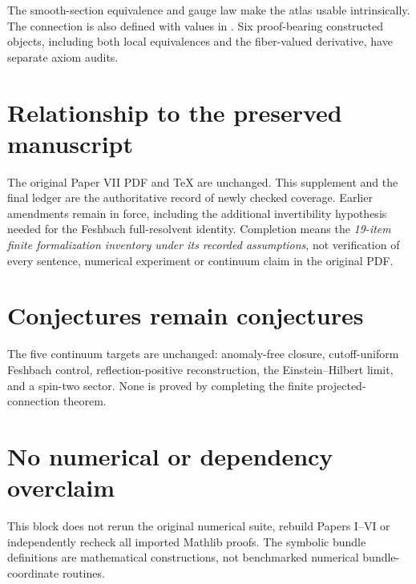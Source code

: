\documentclass[10pt,letterpaper]{article}
\begin{document}
The smooth-section equivalence and gauge law make the atlas usable intrinsically. The connection is also defined with values in . Six proof-bearing constructed objects, including both local equivalences and the fiber-valued derivative, have separate axiom audits.

\section*{Relationship to the preserved manuscript}
The original Paper VII PDF and TeX are unchanged. This supplement and the final ledger are the authoritative record of newly checked coverage. Earlier amendments remain in force, including the additional invertibility hypothesis needed for the Feshbach full-resolvent identity. Completion means the \emph{19-item finite formalization inventory under its recorded assumptions}, not verification of every sentence, numerical experiment or continuum claim in the original PDF.

\section*{Conjectures remain conjectures}
The five continuum targets are unchanged: anomaly-free closure, cutoff-uniform Feshbach control, reflection-positive reconstruction, the Einstein--Hilbert limit, and a spin-two sector. None is proved by completing the finite projected-connection theorem.

\section*{No numerical or dependency overclaim}
This block does not rerun the original numerical suite, rebuild Papers I--VI or independently recheck all imported Mathlib proofs. The symbolic bundle definitions are mathematical constructions, not benchmarked numerical bundle-coordinate routines.
\end{document}
